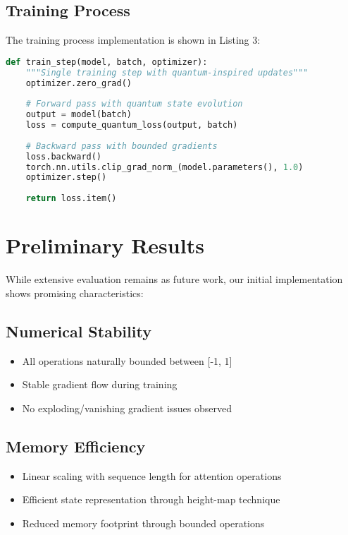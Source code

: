 \documentclass[twocolumn]{article}
\begin{document}
\subsection{Training Process}
The training process implementation is shown in Listing 3:

\begin{lstlisting}[language=Python, caption=Training Process Implementation]
def train_step(model, batch, optimizer):
    """Single training step with quantum-inspired updates"""
    optimizer.zero_grad()
    
    # Forward pass with quantum state evolution
    output = model(batch)
    loss = compute_quantum_loss(output, batch)
    
    # Backward pass with bounded gradients
    loss.backward()
    torch.nn.utils.clip_grad_norm_(model.parameters(), 1.0)
    optimizer.step()
    
    return loss.item()
\end{lstlisting}

\section{Preliminary Results}
While extensive evaluation remains as future work, our initial implementation shows promising characteristics:

\subsection{Numerical Stability}
\begin{itemize}
    \item All operations naturally bounded between [-1, 1]
    \item Stable gradient flow during training
    \item No exploding/vanishing gradient issues observed
\end{itemize}

\subsection{Memory Efficiency}
\begin{itemize}
    \item Linear scaling with sequence length for attention operations
    \item Efficient state representation through height-map technique
    \item Reduced memory footprint through bounded operations
\end{itemize}
\end{document}
